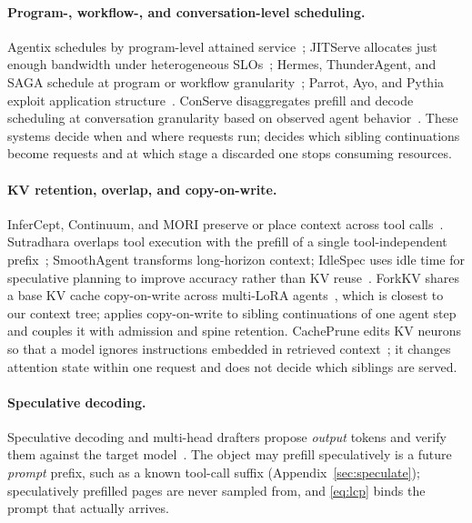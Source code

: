 \paragraph{Program-, workflow-, and conversation-level scheduling.}
Agentix schedules by program-level attained service~\cite{autellix}; JITServe allocates just enough bandwidth under heterogeneous SLOs~\cite{jitserve}; Hermes, ThunderAgent, and SAGA schedule at program or workflow granularity~\cite{hermes,thunderagent,saga}; Parrot, Ayo, and Pythia exploit application structure~\cite{parrot,ayo,pythia}.
ConServe disaggregates prefill and decode scheduling at conversation granularity based on observed agent behavior~\cite{conserve}.
These systems decide when and where requests run; \sys decides which sibling continuations become requests and at which stage a discarded one stops consuming resources.

\paragraph{KV retention, overlap, and copy-on-write.}
InferCept, Continuum, and MORI preserve or place context across tool calls~\cite{infercept,continuum,mori}.
Sutradhara overlaps tool execution with the prefill of a single tool-independent prefix~\cite{sutradhara}; SmoothAgent transforms long-horizon context; IdleSpec uses idle time for speculative planning to improve accuracy rather than KV reuse~\cite{smoothagent,idlespec}.
ForkKV shares a base KV cache copy-on-write across multi-LoRA agents~\cite{forkkv}, which is closest to our context tree; \sys applies copy-on-write to sibling continuations of one agent step and couples it with admission and spine retention.
CachePrune edits KV neurons so that a model ignores instructions embedded in retrieved context~\cite{cacheprune}; it changes attention state within one request and does not decide which siblings are served.

\paragraph{Speculative decoding.}
Speculative decoding and multi-head drafters propose \emph{output} tokens and verify them against the target model~\cite{speculative,medusa,eagledraft}.
The object \sys may prefill speculatively is a future \emph{prompt} prefix, such as a known tool-call suffix (Appendix~\ref{sec:speculate}); speculatively prefilled pages are never sampled from, and \eqref{eq:lcp} binds the prompt that actually arrives.
